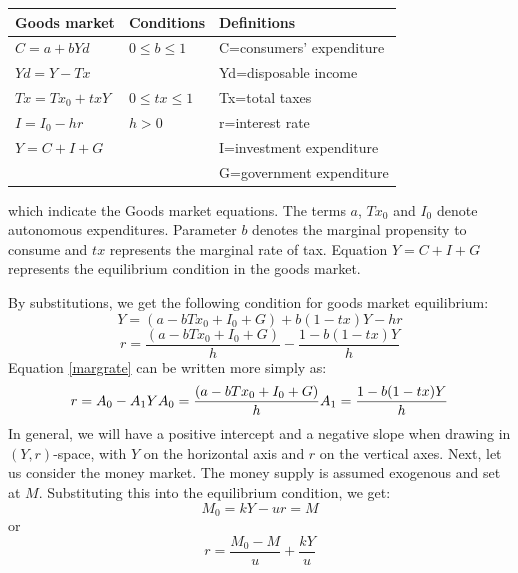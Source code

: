 \documentclass[a4paper,12pt]{report}
\begin{document}
\begin{table}[]
\begin{tabular}{|l|l|l|}
\hline
Goods market    & Conditions        & Definitions              \\ \hline
$C=a+bYd$       & $0\leq b\leq 1$   & C=consumers' expenditure \\ \hline
$Yd=Y-Tx$       &                   & Yd=disposable income     \\ \hline
$Tx=Tx_{0}+txY$ & $0\leq tx \leq 1$ & Tx=total taxes           \\ \hline
$I=I_{0}-hr$    & $h>0$             & r=interest rate          \\ \hline
$Y=C+I+G$       &                   & I=investment expenditure \\ \hline
                &                   & G=government expenditure \\ \hline
\end{tabular}
\end{table}
which indicate the Goods market equations. The terms $a$, $Tx_{0}$ and $I_{0}$ denote autonomous expenditures. Parameter $b$ denotes the marginal propensity to consume and $tx$ represents the marginal rate of tax. Equation $Y=C+I+G$ represents the equilibrium condition in the goods market.\par
By substitutions, we get the following condition for goods market equilibrium:
\begin{equation}\label{incomeislm}
 Y=(a-bTx_{0}+I_{0}+G)+b(1-tx)Y-hr
\end{equation}
\begin{equation}\label{margrate}
 r=\frac{(a-bTx_{0}+I_{0}+G)}{h}-\frac{1-b(1-tx)Y}{h}
\end{equation}
Equation \eqref{margrate} can be written more simply as:
\begin{equation}\label{simple mr}
 r=A_{0}-A_{1}Y \\
 A_{0}=\frac{(a-bTx_{0}+I_{0}+G)}{h} \\
 A_{1}=\frac{1-b(1-tx)Y}{h}
\end{equation}
In general, we will have a positive intercept and a negative slope when drawing in $(Y,r)$-space, with $Y$ on the horizontal axis and $r$ on the vertical axes.
Next, let us consider the money market. The money supply is assumed exogenous and set at $M$. Substituting this into the equilibrium condition, we get:
\begin{equation*}
 M_{0}=kY-ur=M
\end{equation*}
or
\begin{equation}\label{money mr}
 r=\frac{M_{0}-M}{u}+\frac{kY}{u}
\end{equation}
\end{document}
